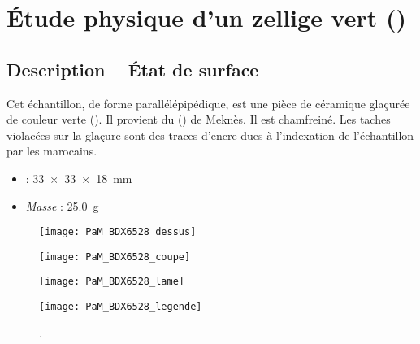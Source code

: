 
\chapter{Étude physique d'un zellige vert ()}

\section{Description -- État de surface}

Cet échantillon, de forme parallélépipédique, est une pièce de 
céramique glaçurée de couleur verte (). 
Il provient du \PaM () de Meknès. 
Il est chamfreiné. Les taches violacées sur la glaçure sont des 
traces d'encre dues à l'indexation de l'échantillon par les marocains.

\begin{itemize}
  \item \DimText : \SI{33x33x18}{\mm}
  \item \emph{Masse} : \SI{25.0}{\g}
\end{itemize}

\begin{figure}[htb]
  \begin{minipage}[t]{6.3cm}
    \centerfloat
    \vspace*{0pt}
    \texttt{[image: PaM\_BDX6528\_dessus]}

    \bigskip
    \bigskip
    \bigskip

    \texttt{[image: PaM\_BDX6528\_coupe]}
  \end{minipage}%
  \qquad%
  \begin{minipage}[t]{6.2cm}
    \centerfloat
    \vspace*{0pt}
    \texttt{[image: PaM\_BDX6528\_lame]}

    \bigskip
    \bigskip

    \texttt{[image: PaM\_BDX6528\_legende]}
  \end{minipage}
  \caption[]{\legendeA.}
  \label{dessin:6528}
\end{figure}

